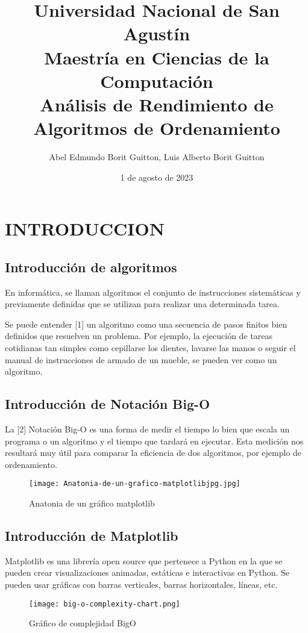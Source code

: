 \documentclass{article}
\title{\textbf{%
    Universidad Nacional de San Agustín \\
    Maestría en Ciencias de la Computación \\
    \large Análisis de Rendimiento de Algoritmos de Ordenamiento}}
\author{Abel Edmundo Borit Guitton, Luis Alberto Borit Guitton}
\date{1 de agosto de 2023}
\begin{document}
\maketitle

\section{INTRODUCCION}
\subsection{Introducción de algoritmos}
En informática, se llaman algoritmos el conjunto de instrucciones sistemáticas y previamente definidas que se utilizan para realizar una determinada tarea.

Se puede entender [1] un algoritmo como una secuencia de pasos finitos bien definidos que resuelven un problema. Por ejemplo, la ejecución de tareas cotidianas tan simples como cepillarse los dientes, lavarse las manos o seguir el manual de instrucciones de armado de un mueble, se pueden ver como un algoritmo.

\subsection{Introducción de Notación Big-O}
La [2] Notación Big-O es una forma de medir el tiempo lo bien que escala un programa o un algoritmo y el tiempo que tardará en ejecutar. Esta medición nos resultará muy útil para comparar la eficiencia de dos algoritmos, por ejemplo de ordenamiento.

\begin{figure}[h]
\centering
\texttt{[image: Anatonia-de-un-grafico-matplotlibjpg.jpg]}
\caption{\label{fig:matplotlib}Anatonia de un gráfico matplotlib}
\end{figure}

\subsection{Introducción de Matplotlib}
Matplotlib es una librería open source que pertenece a Python en la que se pueden crear visualizaciones animadas, estáticas e interactivas en Python. Se pueden usar gráficas con barras verticales, barras horizontales, líneas, etc.

\begin{figure}[h]
\centering
\texttt{[image: big-o-complexity-chart.png]}
\caption{\label{fig:bigo}Gráfico de complejidad BigO}
\end{figure}
\end{document}
